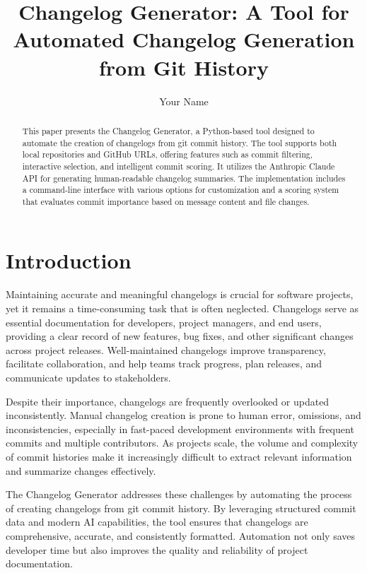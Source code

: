 \documentclass[sigconf]{acmart}
\title{Changelog Generator: A Tool for Automated Changelog Generation from Git History}
\author{Your Name}
\affiliation{
  \institution{Oregon State University}
  \city{Corvallis}
  \state{Oregon}
  \country{USA}
}
\begin{document}
\begin{abstract}
This paper presents the Changelog Generator, a Python-based tool designed to automate the creation of changelogs from git commit history. The tool supports both local repositories and GitHub URLs, offering features such as commit filtering, interactive selection, and intelligent commit scoring. It utilizes the Anthropic Claude API for generating human-readable changelog summaries. The implementation includes a command-line interface with various options for customization and a scoring system that evaluates commit importance based on message content and file changes.
\end{abstract}

\maketitle

\section{Introduction}
Maintaining accurate and meaningful changelogs is crucial for software projects, yet it remains a time-consuming task that is often neglected. Changelogs serve as essential documentation for developers, project managers, and end users, providing a clear record of new features, bug fixes, and other significant changes across project releases. Well-maintained changelogs improve transparency, facilitate collaboration, and help teams track progress, plan releases, and communicate updates to stakeholders.

Despite their importance, changelogs are frequently overlooked or updated inconsistently. Manual changelog creation is prone to human error, omissions, and inconsistencies, especially in fast-paced development environments with frequent commits and multiple contributors. As projects scale, the volume and complexity of commit histories make it increasingly difficult to extract relevant information and summarize changes effectively.

The Changelog Generator addresses these challenges by automating the process of creating changelogs from git commit history. By leveraging structured commit data and modern AI capabilities, the tool ensures that changelogs are comprehensive, accurate, and consistently formatted. Automation not only saves developer time but also improves the quality and reliability of project documentation.
\end{document}
